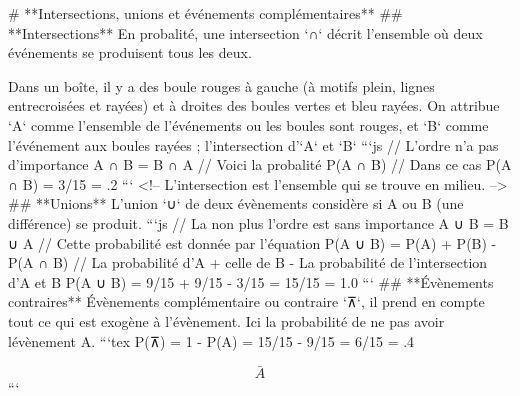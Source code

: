 # **Intersections, unions et événements complémentaires**
## **Intersections**
En probalité, une intersection `∩` décrit l’ensemble où deux événements se produisent tous les deux.

Dans un boîte, il y a des boule rouges à gauche (à motifs plein, lignes entrecroisées et rayées) et à droites des boules vertes et bleu rayées.  
On attribue `A` comme l’ensemble de l’événements ou les boules sont rouges, et `B` comme l’événement aux boules rayées ; l’intersection d’`A` et `B`
```js
// L'ordre n'a pas d'importance
A ∩ B = B ∩ A
// Voici la probalité
P(A ∩ B)
// Dans ce cas
P(A ∩ B) = 3/15 = .2
```
<!-- L'intersection est l'ensemble qui se trouve en milieu. -->
## **Unions**
L’union `∪` de deux évènements considère si A ou B (une différence) se produit.
```js
// La non plus l'ordre est sans importance
A ∪ B = B ∪ A
// Cette probabilité est donnée par l'équation
P(A ∪ B) = P(A) + P(B) - P(A ∩ B)
// La probabilité d'A + celle de B - La probabilité de l'intersection d'A et B
P(A ∪ B) = 9/15 + 9/15 - 3/15 = 15/15 = 1.0
```
## **Évènements contraires**
Évènements complémentaire ou contraire `⊼`, il prend en compte tout ce qui est exogène à l’évènement.  
Ici la probabilité de ne pas avoir lévènement A.
```tex
P(⊼) = 1 - P(A) = 15/15 - 9/15 = 6/15 = .4

$$\bar{A}$$
{}
```